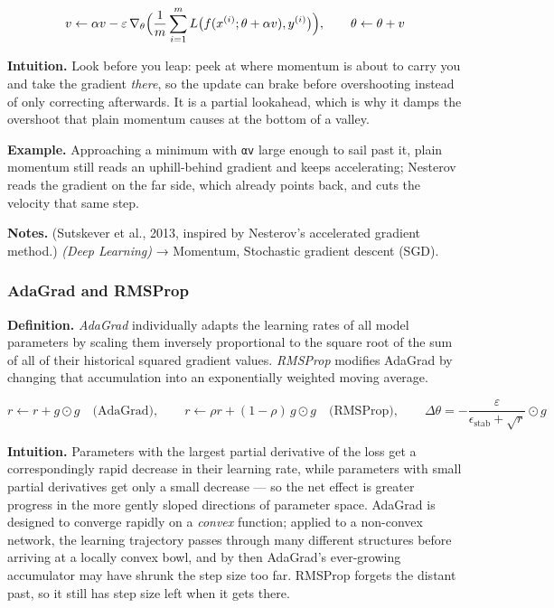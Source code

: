 \documentclass[
  10pt,
  letterpaper,
  onecolumn]{article}
\begin{document}
\begin{equation*}
v\leftarrow\alpha v-\varepsilon\,\nabla_\theta\Bigl(\frac{1}{m}\sum_{i=1}^{m}L\bigl(f(x^{(i)};\theta+\alpha v),y^{(i)}\bigr)\Bigr),
\qquad
\theta\leftarrow\theta+v
\end{equation*}

\textbf{Intuition.} Look before you leap: peek at where momentum is
about to carry you and take the gradient \emph{there}, so the update
can brake before overshooting instead of only correcting afterwards. It
is a partial lookahead, which is why it damps the overshoot that plain
momentum causes at the bottom of a valley.

\textbf{Example.} Approaching a minimum with \texttt{αv} large enough to
sail past it, plain momentum still reads an uphill-behind gradient and
keeps accelerating; Nesterov reads the gradient on the far side, which
already points back, and cuts the velocity that same step.

\textbf{Notes.} (Sutskever et al., 2013, inspired by Nesterov's
accelerated gradient method.) \emph{(Deep Learning)} → Momentum,
Stochastic gradient descent (SGD).

\hypertarget{adagrad-and-rmsprop}{%
\subsubsection{AdaGrad and RMSProp}\label{adagrad-and-rmsprop}}

\textbf{Definition.} \emph{AdaGrad} individually adapts the learning
rates of all model parameters by scaling them inversely proportional to
the square root of the sum of all of their historical squared gradient
values. \emph{RMSProp} modifies AdaGrad by changing that accumulation
into an exponentially weighted moving average.

\begin{equation*}
r\leftarrow r+g\odot g
\quad\text{(AdaGrad)},
\qquad
r\leftarrow\rho r+(1-\rho)\,g\odot g
\quad\text{(RMSProp)},
\qquad
\Delta\theta=-\frac{\varepsilon}{\epsilon_{\text{stab}}+\sqrt{r}}\odot g
\end{equation*}

\textbf{Intuition.} Parameters with the largest partial derivative of
the loss get a correspondingly rapid decrease in their learning rate,
while parameters with small partial derivatives get only a small
decrease --- so the net effect is greater progress in the more gently
sloped directions of parameter space. AdaGrad is designed to converge
rapidly on a \emph{convex} function; applied to a non-convex network,
the learning trajectory passes through many different structures before
arriving at a locally convex bowl, and by then AdaGrad's ever-growing
accumulator may have shrunk the step size too far. RMSProp forgets the
distant past, so it still has step size left when it gets there.
\end{document}
